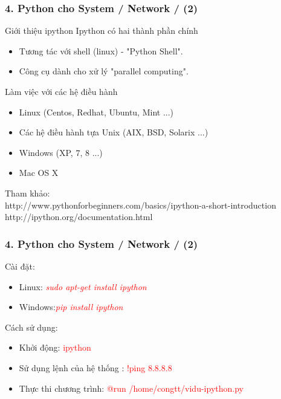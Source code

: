 \documentclass[10pt]{beamer}
\begin{document}
\label{Slide 4:Python cho Sysad - ipython}
\begin{frame}[fragile] \label{Gioi thieu ipython}
\label{Slide xxx: Gioi thieu ve ipython }
\frametitle{4. Python cho System / Network / (2) }
\begin{block}{Giới thiệu ipython}
Ipython có hai thành phần chính
\begin{itemize}
\item Tương tác với shell (linux) - "Python Shell".
\item Công cụ dành cho xử lý "parallel computing".
\end{itemize}
Làm việc với các hệ điều hành
\begin{itemize}
\item Linux (Centos, Redhat, Ubuntu, Mint ...)
\item Các hệ điều hành tựa Unix (AIX, BSD, Solarix ...)
\item Windows (XP, 7, 8 ...)
\item Mac OS X
\end{itemize}
\end{block}
Tham khảo:\\
http://www.pythonforbeginners.com/basics/ipython-a-short-introduction\\
http://ipython.org/documentation.html
\end{frame}
\label{Slide xxx: cai dat va su dung ipython}
\begin{frame}[fragile]
\frametitle{4. Python cho System / Network / (2)}
Cài đặt:
\pause
\begin{itemize}
\item Linux: \textit{\textcolor{red}{sudo apt-get install ipython}}
\pause
\item Windows:\textit{\textcolor{red}{pip install ipython}}
\end{itemize}
\pause
Cách sử dụng:
\pause
\begin{itemize}
\item Khởi động: \textcolor{red}{ipython}\pause
\item Sử dụng lệnh của hệ thống : \textcolor{red}{!ping 8.8.8.8}\pause
\item Thực thi chương trình: \textcolor{red}{@run /home/congtt/vidu-ipython.py}
\end{itemize}
\end{frame}
\label{Slide xxx:Python cho Sysad - fabric}
\end{document}
